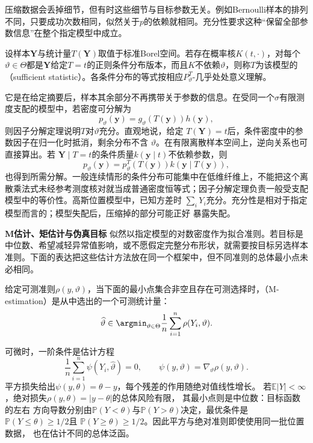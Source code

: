 压缩数据会丢掉细节，但有时这些细节与目标参数无关。例如Bernoulli样本的排列不同，只要成功次数相同，似然关于\(p\)的依赖就相同。充分性要求这种“保留全部参数信息”在整个指定模型中成立。
\begin{definition}[充分统计量]
  \label{def:statistics-sufficient-statistic}
  设样本\(\bm Y\)与统计量\(T(\bm Y)\)取值于标准Borel空间。若存在概率核\(K(t,\cdot)\)，对每个\(\vartheta\in\Theta\)都是\(\bm Y\)给定\(T=t\)的正则条件分布版本，而且\(K\)不依赖\(\vartheta\)，则称\(T\)为该模型的（sufficient statistic）。各条件分布的等式按相应\(P_\vartheta^T\)-几乎处处意义理解。
\end{definition}
它是在给定摘要后，样本其余部分不再携带关于参数的信息。在受同一个\(\sigma\)有限测度支配的模型中，若密度可分解为
\[
  p_\vartheta(\bm y)=g_\vartheta(T(\bm y))h(\bm y),
\]
则因子分解定理说明\(T\)对\(\vartheta\)充分。直观地说，给定
\(T(\bm Y)=t\)后，条件密度中的参数因子在归一化时抵消，剩余分布不含
\(\vartheta\)。在有限离散样本空间上，逆向关系也可直接算出。若
\(\bm Y\mid T=t\)的条件质量\(k(\bm y\mid t)\)不依赖参数，则
\[
  p_\vartheta(\bm y)
  =p_\vartheta^T(T(\bm y))k(\bm y\mid T(\bm y)),
\]
也得到所需分解。一般连续情形的条件分布可能集中在低维纤维上，不能把这个离散乘法式未经参考测度核对就当成普通密度恒等式；因子分解定理负责一般受支配模型中的等价性。高斯位置模型中，已知方差时
\(\sum_iY_i\)充分。充分性是相对于指定模型而言的；模型失配后，压缩掉的部分可能正好
暴露失配。

\par\medskip\noindent\textbf{M估计、矩估计与伪真目标}\quad
似然以指定模型的对数密度作为拟合准则。若目标是中位数、希望减轻异常值影响，或不愿假定完整分布形状，就需要按目标另选样本准则。下面的表达把这些估计方法放在同一个框架中，但不同准则的总体最小点未必相同。
\begin{definition}[M估计]
  \label{def:statistics-m-estimator}
给定可测准则\(\rho(y,\vartheta)\)，当下面的最小点集合非空且存在可测选择时，（M-estimation）是从中选出的一个可测统计量：
\[
  \widehat\vartheta
  \in\argmin_{\vartheta\in\Theta}
  \frac1n\sum_{i=1}^n\rho(Y_i,\vartheta).
\]
\end{definition}
可微时，一阶条件是估计方程
\[
  \frac1n\sum_{i=1}^n\psi(Y_i,\widehat\vartheta)=0,
  \qquad
  \psi(y,\vartheta)=\nabla_\vartheta\rho(y,\vartheta).
\]
平方损失给出\(\psi(y,\theta)=\theta-y\)，每个残差的作用随绝对值线性增长。
若\(\mathbb E|Y|<\infty\)，绝对损失\(\rho(y,\theta)=|y-\theta|\)的总体风险有限，
其最小点则是中位数：目标函数的左右
方向导数分别由\(\mathbb{P}(Y<\theta)\)与\(\mathbb{P}(Y>\theta)\)决定，最优条件是
\(\mathbb{P}(Y\leq\theta)\geq1/2\)且
\(\mathbb{P}(Y\geq\theta)\geq1/2\)。因此平方与绝对准则即使使用同一批位置数据，
也在估计不同的总体泛函。

